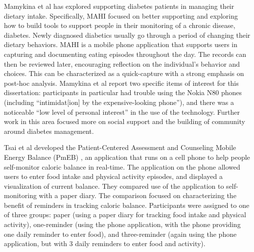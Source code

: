 Mamykina et al \citep{mamykina_examining_2011, mamykina_mahi:_2008} has explored supporting diabetes patients in managing their dietary intake. Specifically, MAHI focused on better supporting and exploring how to build tools to support people in their monitoring of a chronic disease, diabetes. Newly diagnosed diabetics usually go through a period of changing their dietary behaviors. MAHI is a mobile phone application that supports users in capturing and documenting eating episodes throughout the day. The records can then be reviewed later, encouraging reflection on the individual's behavior and choices. This can be characterized as a quick-capture with a strong emphasis on post-hoc analysis. Mamykina et al report \citep{mamykina_mahi:_2008} two specific items of interest for this dissertation: participants in particular had trouble using the Nokia N80 phones (including ``intimidat[ion] by the expensive-looking phone''), and there was a noticeable ``low level of personal interest'' in the use of the technology. Further work in this area focused more on social support and the building of community around diabetes management. 

Tsai et al developed the Patient-Centered Assessment and Counseling Mobile Energy Balance (PmEB) \citep{tsai_usability_2007},  an application that runs on a cell phone to help people self-monitor caloric balance in real-time.  The application on the phone allowed users to enter food intake and physical activity episodes, and displayed a visualization of current balance. They compared use of the application to self-monitoring with a paper diary. The comparison focused on characterizing the benefit of reminders in tracking caloric balance. Participants were assigned to one of three groups: paper (using a paper diary for tracking food intake and physical activity), one-reminder (using the phone application, with the phone providing one daily reminder to enter food), and three-reminder (again using the phone application, but with 3 daily reminders to enter food and activity). 

